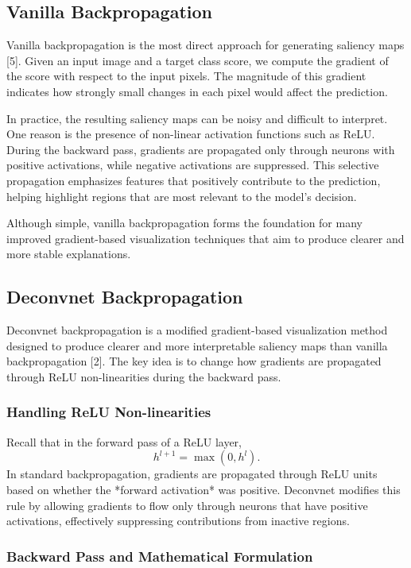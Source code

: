 \documentclass{article}
\renewcommand{\cite}[1]{[#1]}
\begin{document}
\subsection{Vanilla Backpropagation}

Vanilla backpropagation is the most direct approach for generating saliency maps \cite{5}. Given an input image and a target class score, we compute the gradient of the score with respect to the input pixels. The magnitude of this gradient indicates how strongly small changes in each pixel would affect the prediction.

In practice, the resulting saliency maps can be noisy and difficult to interpret. One reason is the presence of non-linear activation functions such as ReLU. During the backward pass, gradients are propagated only through neurons with positive activations, while negative activations are suppressed. This selective propagation emphasizes features that positively contribute to the prediction, helping highlight regions that are most relevant to the model’s decision.

Although simple, vanilla backpropagation forms the foundation for many improved gradient-based visualization techniques that aim to produce clearer and more stable explanations.

\subsection{Deconvnet Backpropagation}

Deconvnet backpropagation is a modified gradient-based visualization method designed to produce clearer and more interpretable saliency maps than vanilla backpropagation \cite{2}. The key idea is to change how gradients are propagated through ReLU non-linearities during the backward pass.

\subsubsection{Handling ReLU Non-linearities}

Recall that in the forward pass of a ReLU layer,
\[
h^{l+1} = \max(0, h^l).
\]
In standard backpropagation, gradients are propagated through ReLU units based on whether the *forward activation* was positive. Deconvnet modifies this rule by allowing gradients to flow only through neurons that have positive activations, effectively suppressing contributions from inactive regions.

\subsubsection{Backward Pass and Mathematical Formulation}
\end{document}
